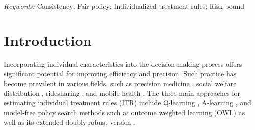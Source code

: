 \documentclass[12pt]{article}
\theoremstyle{plain}
\theoremstyle{definition}
\theoremstyle{remark}
\begin{document}
\begin{abstract}
There has been growing interest in developing optimal individualized treatment rules (ITRs) in various fields, such as precision medicine, business decision-making, and social welfare distribution. The application of ITRs within a societal context raises substantial concerns regarding potential discrimination over sensitive attributes such as age, gender, or race.
To address this concern directly, we introduce the concept of demographic parity  in ITRs. However, estimating an optimal ITR that satisfies the demographic parity  requires solving a non-convex constrained optimization problem. To overcome these computational challenges, we employ tailored fairness proxies inspired by demographic parity and transform it into a convex quadratic programming problem. Additionally, we establish the consistency  of the proposed estimator and the risk bound. The performance of the proposed method is demonstrated through extensive simulation studies and real data analysis.

\end{abstract}


\noindent
{\it Keywords:} Consistency; Fair policy; Individualized treatment rules; Risk bound
\vfill

\section{Introduction}
\label{sec:intro}

Incorporating individual characteristics into the decision-making process offers significant potential for improving efficiency and precision. Such practice has become prevalent in various fields, such as precision medicine \citep{shi2018high, wang2018learning}, social welfare distribution \citep{rosholm2010reducing}, ridesharing \citep{shi2022off}, and mobile health \citep{shi2022statistically}.
The three main approaches for estimating individual treatment rules (ITR) include Q-learning \citep{dayan1992q,chakraborty2010inference, qian2011performance, song2015penalized}, A-learning \citep{robins2000marginal,murphy2003optimal,robins2004optimal}, and model-free policy search methods such as outcome weighted learning (OWL) \citep{zhao2012estimating} as well as its extended doubly robust version \citep{liu2018augmented}.
\end{document}
